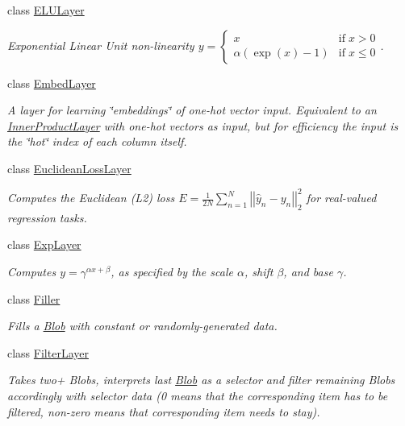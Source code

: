 \begin{DoxyCompactItemize}
class \hyperlink{classcaffe_1_1ELULayer}{E\+L\+U\+Layer}
\begin{DoxyCompactList}\small\item\em Exponential Linear Unit non-\/linearity $ y = \left\{ \begin{array}{lr} x & \mathrm{if} \; x > 0 \\ \alpha (\exp(x)-1) & \mathrm{if} \; x \le 0 \end{array} \right. $. \end{DoxyCompactList}\item 
class \hyperlink{classcaffe_1_1EmbedLayer}{Embed\+Layer}
\begin{DoxyCompactList}\small\item\em A layer for learning \char`\"{}embeddings\char`\"{} of one-\/hot vector input. Equivalent to an \hyperlink{classcaffe_1_1InnerProductLayer}{Inner\+Product\+Layer} with one-\/hot vectors as input, but for efficiency the input is the \char`\"{}hot\char`\"{} index of each column itself. \end{DoxyCompactList}\item 
class \hyperlink{classcaffe_1_1EuclideanLossLayer}{Euclidean\+Loss\+Layer}
\begin{DoxyCompactList}\small\item\em Computes the Euclidean (L2) loss $ E = \frac{1}{2N} \sum\limits_{n=1}^N \left| \left| \hat{y}_n - y_n \right| \right|_2^2 $ for real-\/valued regression tasks. \end{DoxyCompactList}\item 
class \hyperlink{classcaffe_1_1ExpLayer}{Exp\+Layer}
\begin{DoxyCompactList}\small\item\em Computes $ y = \gamma ^ {\alpha x + \beta} $, as specified by the scale $ \alpha $, shift $ \beta $, and base $ \gamma $. \end{DoxyCompactList}\item 
class \hyperlink{classcaffe_1_1Filler}{Filler}
\begin{DoxyCompactList}\small\item\em Fills a \hyperlink{classcaffe_1_1Blob}{Blob} with constant or randomly-\/generated data. \end{DoxyCompactList}\item 
class \hyperlink{classcaffe_1_1FilterLayer}{Filter\+Layer}
\begin{DoxyCompactList}\small\item\em Takes two+ Blobs, interprets last \hyperlink{classcaffe_1_1Blob}{Blob} as a selector and filter remaining Blobs accordingly with selector data (0 means that the corresponding item has to be filtered, non-\/zero means that corresponding item needs to stay). \end{DoxyCompactList}\item 

\end{DoxyCompactItemize}
